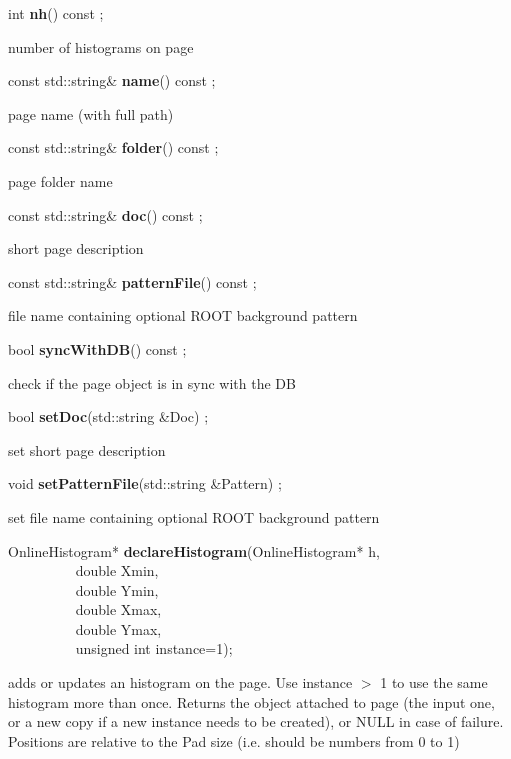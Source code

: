 \item    int {\bf nh}() const ;

 number of histograms on page


\item    const std::string\& {\bf name}() const ;

 page name (with full path)


\item    const std::string\& {\bf folder}() const ;

 page folder name


\item    const std::string\& {\bf doc}() const ;

 short page description


\item    const std::string\& {\bf patternFile}() const ;

 file name containing optional ROOT background pattern 


\item    bool {\bf syncWithDB}() const ;

 check if the page object is in sync with the DB


\item    bool {\bf setDoc}(std::string \&Doc) ;

 set short page description


\item    void {\bf setPatternFile}(std::string \&Pattern) ;

 set file name containing optional ROOT background pattern 


\item    OnlineHistogram* {\bf declareHistogram}(OnlineHistogram* h,\\\mbox{}~~~~~~~~~
                                    double Xmin,\\\mbox{}~~~~~~~~~
                                    double Ymin,\\\mbox{}~~~~~~~~~
                                    double Xmax,\\\mbox{}~~~~~~~~~
                                    double Ymax,\\\mbox{}~~~~~~~~~
                                    unsigned int instance=1);

 adds or updates an histogram on the page. Use instance $>$ 1 to use the
 same histogram more than once. Returns the object attached to page (the input
 one, or a new copy if a new instance needs to be created), or NULL in case of failure.
 Positions are relative to the Pad size (i.e. should be numbers from 0 to 1)


